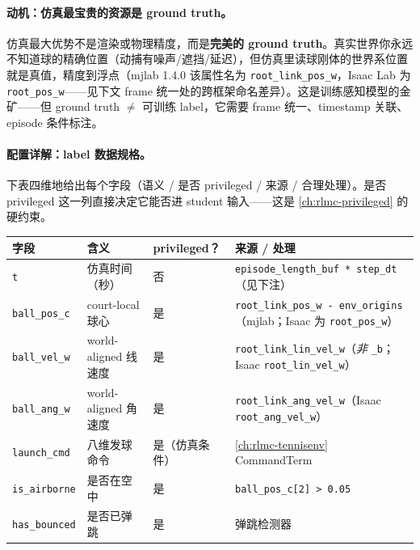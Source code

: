 \paragraph{动机：仿真最宝贵的资源是 ground truth。}仿真最大优势不是渲染或物理精度，而是\textbf{完美的 ground truth}。真实世界你永远不知道球的精确位置（动捕有噪声/遮挡/延迟），但仿真里读球刚体的世界系位置就是真值，精度到浮点（mjlab 1.4.0 该属性名为 \verb|root_link_pos_w|，Isaac Lab 为 \verb|root_pos_w|——见下文 frame 统一处的跨框架命名差异）。这是训练感知模型的金矿——但 ground truth $\neq$ 可训练 label，它需要 frame 统一、timestamp 关联、episode 条件标注。

\paragraph{配置详解：label 数据规格。}下表四维地给出每个字段（语义 / 是否 privileged / 来源 / 合理处理）。是否 privileged 这一列直接决定它能否进 student 输入——这是 \cref{ch:rlmc-privileged} 的硬约束。

\begin{center}
\small
\begin{tabular}{@{}lllp{3.2cm}@{}}
\toprule
字段 & 含义 & privileged？ & 来源 / 处理 \\
\midrule
\verb|t| & 仿真时间（秒） & 否 & \verb|episode_length_buf * step_dt|（见下注） \\
\verb|ball_pos_c| & court-local 球心 & 是 & \verb|root_link_pos_w - env_origins|（mjlab；Isaac 为 \verb|root_pos_w|） \\
\verb|ball_vel_w| & world-aligned 线速度 & 是 & \verb|root_link_lin_vel_w|（\emph{非} \verb|_b|；Isaac \verb|root_lin_vel_w|） \\
\verb|ball_ang_w| & world-aligned 角速度 & 是 & \verb|root_link_ang_vel_w|（Isaac \verb|root_ang_vel_w|） \\
\verb|launch_cmd| & 八维发球命令 & 是（仿真条件） & \cref{ch:rlmc-tennisenv} CommandTerm \\
\verb|is_airborne| & 是否在空中 & 是 & \verb|ball_pos_c[2] > 0.05| \\
\verb|has_bounced| & 是否已弹跳 & 是 & 弹跳检测器 \\
\bottomrule
\end{tabular}
\end{center}



